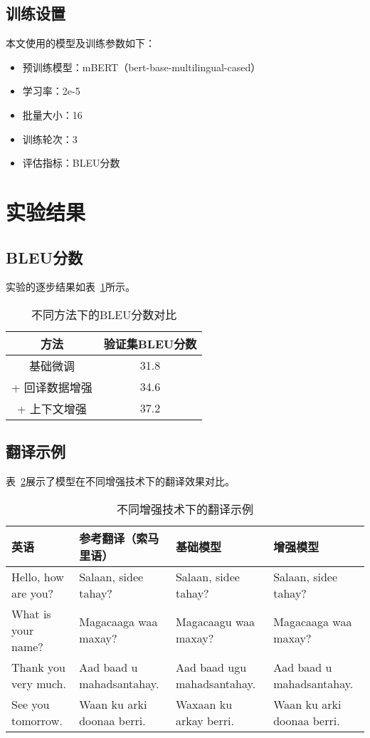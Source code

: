 \documentclass[a4paper,12pt]{article}
\begin{document}
\subsection{训练设置}
本文使用的模型及训练参数如下：
\begin{itemize}
    \item 预训练模型：mBERT（bert-base-multilingual-cased）
    \item 学习率：2e-5
    \item 批量大小：16
    \item 训练轮次：3
    \item 评估指标：BLEU分数
\end{itemize}

\section{实验结果}

\subsection{BLEU分数}
实验的逐步结果如表~\ref{tab:bleu}所示。
\begin{table}[h]
\centering
\begin{tabular}{|c|c|}
\hline
\textbf{方法} & \textbf{验证集BLEU分数} \\ \hline
基础微调 & 31.8 \\ \hline
+ 回译数据增强 & 34.6 \\ \hline
+ 上下文增强 & 37.2 \\ \hline
\end{tabular}
\caption{不同方法下的BLEU分数对比}
\label{tab:bleu}
\end{table}

\subsection{翻译示例}
表~\ref{tab:examples}展示了模型在不同增强技术下的翻译效果对比。
\begin{table}[h]
\centering
\begin{tabular}{|l|l|l|l|}
\hline
\textbf{英语} & \textbf{参考翻译（索马里语）} & \textbf{基础模型} & \textbf{增强模型} \\ \hline
Hello, how are you? & Salaan, sidee tahay? & Salaan, sidee tahay? & Salaan, sidee tahay? \\ \hline
What is your name? & Magacaaga waa maxay? & Magacaagu waa maxay? & Magacaaga waa maxay? \\ \hline
Thank you very much. & Aad baad u mahadsantahay. & Aad baad ugu mahadsantahay. & Aad baad u mahadsantahay. \\ \hline
See you tomorrow. & Waan ku arki doonaa berri. & Waxaan ku arkay berri. & Waan ku arki doonaa berri. \\ \hline
\end{tabular}
\caption{不同增强技术下的翻译示例}
\label{tab:examples}
\end{table}
\end{document}
